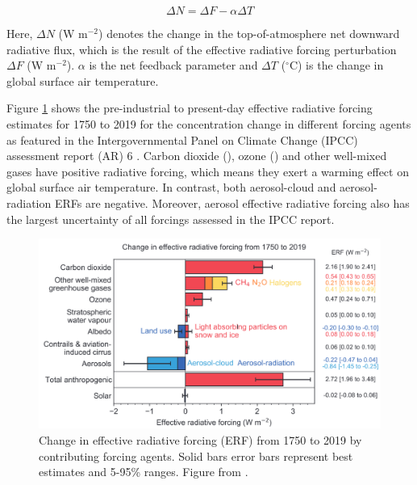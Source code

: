 \begin{equation}
\label{eq:erf-short}
    \Delta N = \Delta F - \alpha \Delta T
\end{equation}

Here, $\Delta N$ (W m$^{-2}$) denotes the change in the top-of-atmosphere net downward radiative flux, which is the result of the effective radiative forcing perturbation $\Delta F$ (W m$^{-2}$). $\alpha$ is the net feedback parameter and $\Delta T$ ($^\circ$C) is the change in global surface air temperature. 

Figure \ref{fig:1.ERF} shows the pre-industrial to present-day effective radiative forcing estimates for 1750 to 2019 for the concentration change in different forcing agents as featured in the Intergovernmental Panel on Climate Change (IPCC) assessment report (AR) 6 \citep{forsterEarthEnergyBudget2021}. Carbon dioxide (), ozone () and other well-mixed gases have positive radiative forcing, which means they exert a warming effect on global surface air temperature. In contrast, both aerosol-cloud and aerosol-radiation ERFs are negative. Moreover, aerosol effective radiative forcing also has the largest uncertainty of all forcings assessed in the IPCC report.

\begin{figure}
    \centering
    \includegraphics[width=6in]{Chapter1/figs/02_ERF.png}
    \caption[Effective radiative forcing (ERF) from 1750 to 2019]{Change in effective radiative forcing (ERF) from 1750 to 2019 by contributing forcing agents. Solid bars error bars represent best estimates and 5-95\% ranges. Figure from \citet{forsterEarthEnergyBudget2021}.}
    \label{fig:1.ERF}
\end{figure}

